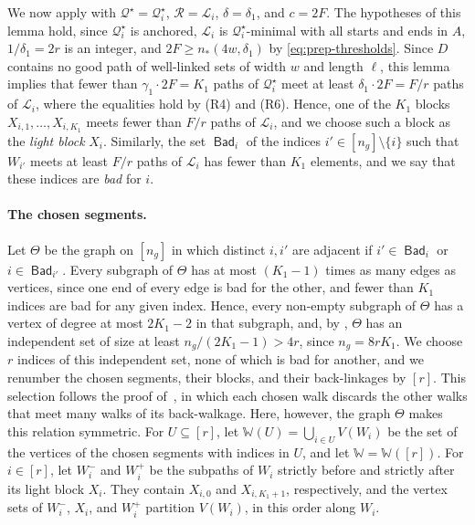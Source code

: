 \documentclass[fontsize=12pt,leading=14pt]{fullpaper}
\DeclareMathOperator{\Bad}{\mathsf{Bad}}
\newcommand{\Lcal}{\mathcal{L}}
\newcommand{\Qcal}{\mathcal{Q}}
\newcommand{\Rcal}{\mathcal{R}}
\newcommand{\WW}{\mathbb{W}}
\begin{document}
We now apply  with $\Qcal^\star=\Qcal^\star_i$, $\Rcal=\Lcal_i$, $\delta=\delta_1$, and $c=2F$.
The hypotheses of this lemma hold, since $\Qcal^\star_i$ is anchored, $\Lcal_i$ is $\Qcal^\star_i$-minimal with all starts and ends in $A$, $1/\delta_1=2r$ is an integer, and $2F\ge n_*(4w,\delta_1)$ by \eqref{eq:prep-thresholds}.
Since $D$ contains no good path of well-linked sets of width $w$ and length $\ell$, this lemma implies that fewer than $\gamma_1\cdot2F=K_1$ paths of $\Qcal^\star_i$ meet at least $\delta_1\cdot2F=F/r$ paths of $\Lcal_i$, where the equalities hold by (R4) and (R6).
Hence, one of the $K_1$ blocks $X_{i,1},\dots,X_{i,K_1}$ meets fewer than $F/r$ paths of $\Lcal_i$, and we choose such a block as the \emph{light block} $X_i$.
Similarly, the set $\Bad_i$ of the indices $i'\in[n_g]\setminus\{i\}$ such that $W_{i'}$ meets at least $F/r$ paths of $\Lcal_i$ has fewer than $K_1$ elements, and we say that these indices are \emph{bad} for $i$.

\paragraph{The chosen segments.}\label{par:prep-select}
Let $\Theta$ be the graph on $[n_g]$ in which distinct $i,i'$ are adjacent if $i'\in\Bad_i$ or $i\in\Bad_{i'}$.
Every subgraph of $\Theta$ has at most $(K_1-1)$ times as many edges as vertices, since one end of every edge is bad for the other, and fewer than $K_1$ indices are bad for any given index.
Hence, every non-empty subgraph of $\Theta$ has a vertex of degree at most $2K_1-2$ in that subgraph, and, by , $\Theta$ has an independent set of size at least $n_g/(2K_1-1)>4r$, since $n_g=8rK_1$.
We choose $r$ indices of this independent set, none of which is bad for another, and we renumber the chosen segments, their blocks, and their back-linkages by $[r]$.
This selection follows the proof of~\cite[Lemma~4.13]{CLNS26}, in which each chosen walk discards the other walks that meet many walks of its back-walkage.
Here, however, the graph $\Theta$ makes this relation symmetric.
For $U\subseteq[r]$, let $\WW(U)=\bigcup_{i\in U}V(W_i)$ be the set of the vertices of the chosen segments with indices in $U$, and let $\WW=\WW([r])$.
For $i\in[r]$, let $W_i^-$ and $W_i^+$ be the subpaths of $W_i$ strictly before and strictly after its light block $X_i$.
They contain $X_{i,0}$ and $X_{i,K_1+1}$, respectively, and the vertex sets of $W_i^-$, $X_i$, and $W_i^+$ partition $V(W_i)$, in this order along $W_i$.
\end{document}
